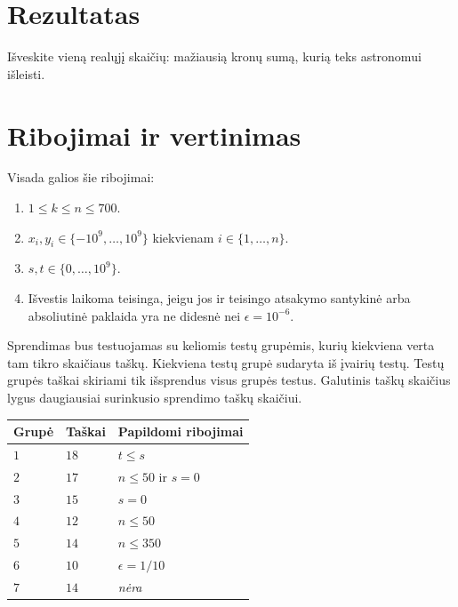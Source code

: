 \section*{Rezultatas}

Išveskite vieną realųjį skaičių: mažiausią kronų sumą, kurią teks astronomui išleisti.

\section*{Ribojimai ir vertinimas}

Visada galios šie ribojimai:
\begin{enumerate}
\item $1\leq k\leq n\leq 700$. %
\item $x_i, y_i\in \{-10^9,\ldots, 10^9\}$ kiekvienam $i\in\{1,\ldots,n\}$. %
\item $s,t\in \{0,\ldots, 10^9\}$. %
\item Išvestis laikoma teisinga, jeigu jos ir teisingo atsakymo
santykinė arba absoliutinė paklaida yra ne didesnė nei $\epsilon = 10^{-6}$.
\end{enumerate}

Sprendimas bus testuojamas su keliomis testų grupėmis, kurių kiekviena verta tam tikro skaičiaus taškų.
Kiekviena testų grupė sudaryta iš įvairių testų.
Testų grupės taškai skiriami tik išsprendus visus grupės testus.
Galutinis taškų skaičius lygus daugiausiai surinkusio sprendimo taškų skaičiui.

\medskip
\noindent
\begin{tabular}{lll}
  Grupė & Taškai & Papildomi ribojimai\\\hline
  $1$ & $18$ &  $t\leq s$\\
  $2$ & $17$ & $n\le 50$ ir $s=0$\\
  $3$ & $15$ & $s=0$\\
  $4$ & $12$ & $n\leq 50$\\
  $5$ & $14$ & $n\leq 350$\\
  $6$ & $10$ & $\epsilon = 1/10$\\
  $7$ & $14$ & \emph{nėra}\\
\end{tabular}
